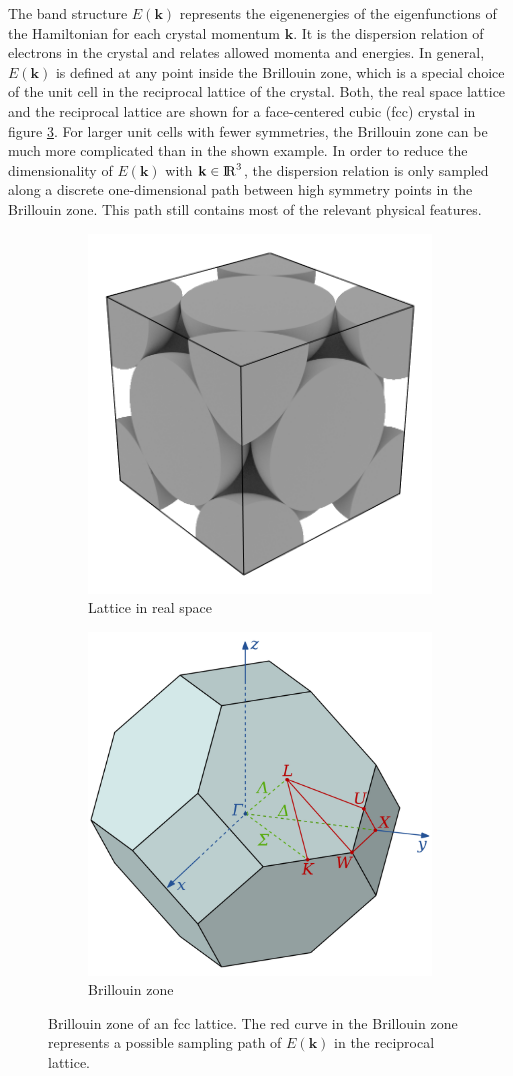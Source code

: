 The band structure $E(\mathbf{k})$ represents the eigenenergies of the eigenfunctions of the Hamiltonian for each crystal momentum $\mathbf{k}$. It is the dispersion relation of electrons in the crystal and relates allowed momenta and energies. In general, $E(\mathbf{k})$ is defined at any point inside the Brillouin zone, which is a special choice of the unit cell in the reciprocal lattice of the crystal. Both, the real space lattice and the reciprocal lattice are shown for a face-centered cubic (fcc) crystal in figure \ref{fcc}. For larger unit cells with fewer symmetries, the Brillouin zone can be much more complicated than in the shown example. In order to reduce the dimensionality of $E(\mathbf{k})$ with $\mathbf{k} \in {\rm I\!R}^3$, the dispersion relation is only sampled along a discrete one-dimensional path between high symmetry points in the Brillouin zone. This path still contains most of the relevant physical features.

\begin{figure}[htb!]
    \centering
    \begin{subfigure}{.5\textwidth}
        \centering
        \includegraphics[width=0.5\linewidth]{christian/fcc_real.png}
        \caption{Lattice in real space \cite{wiki-img-fcc}}
        \label{fig:fcc_real}
    \end{subfigure}%
    \begin{subfigure}{.5\textwidth}
        \centering
        \includegraphics[width=0.5\linewidth]{christian/Brillouin_Zone_(1st,_FCC).png}
        \caption{Brillouin zone \cite{wiki-img-brillouin}}
        \label{fig:fcc_billouin}
    \end{subfigure}
    \caption[Brillouin zone of an fcc lattice]{Brillouin zone of an fcc lattice. The red curve in the Brillouin zone represents a possible sampling path of $E(\mathbf{k})$ in the reciprocal lattice.}
    \label{fcc}
\end{figure}

